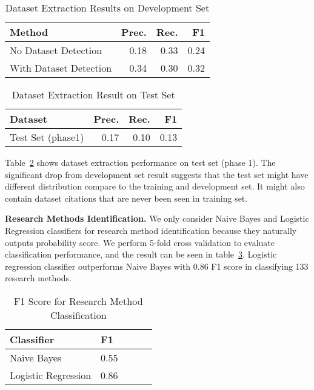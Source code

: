 \begin{table}[t!]
\begin{center}
\begin{tabular}{|l|r|r|r|}
\hline \bf Method  & \bf Prec. & \bf Rec. & \bf F1 \\ \hline
No Dataset Detection & 0.18 & 0.33 & 0.24 \\
With Dataset Detection & 0.34 & 0.30 & 0.32 \\
\hline
\end{tabular}
\end{center}
\caption{\label{tab:de_dev_result} Dataset Extraction Results on Development Set}
\end{table}

\begin{table}[t!]
\begin{center}
\begin{tabular}{|l|r|r|r|}
\hline \bf Dataset  & \bf Prec. & \bf Rec. & \bf F1 \\ \hline
Test Set (phase1) & 0.17 & 0.10 & 0.13 \\
\hline
\end{tabular}
\end{center}
\caption{\label{tab:de_test_result} Dataset Extraction Result on Test Set}
\end{table}

Table~\ref{tab:de_test_result} shows dataset extraction performance on test set (phase 1). The significant drop from development set result suggests that the test set might have different distribution compare to the training and development set. It might also contain dataset citations that are never been seen in training set.

\textbf{Research Methods Identification.} We only consider Naive Bayes and Logistic Regression classifiers for research method identification because they naturally outputs probability score. We perform 5-fold cross validation to evaluate classification performance, and the result can be seen in table~\ref{tab:rmethods_5cv}. Logistic regression classifier outperforms Naive Bayes with 0.86 F1 score in classifying 133 research methods.

\begin{table}[t!]
\begin{center}
\begin{tabular}{|l|l|r|r|r|}
\hline \bf Classifier & \bf F1 \\ \hline
Naive Bayes & 0.55 \\
Logistic Regression & 0.86 \\
\hline
\end{tabular}
\end{center}
\caption{\label{tab:rmethods_5cv} F1 Score for Research Method Classification}
\end{table}

